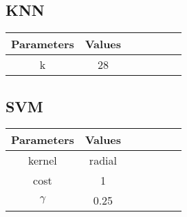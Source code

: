 \documentclass{article}
\begin{document}
\subsection{KNN}
\begin{tabular}{c|cccccc}
\hline\hline
 Parameters & Values\\\hline
 k & 28\\\hline
\end{tabular}

\subsection{SVM}
\begin{tabular}{c|cccccc}
\hline\hline
 Parameters & Values\\\hline
kernel & radial\\\hline
 cost & 1\\\hline
$\gamma$ & 0.25\\\hline
\end{tabular}
\end{document}
